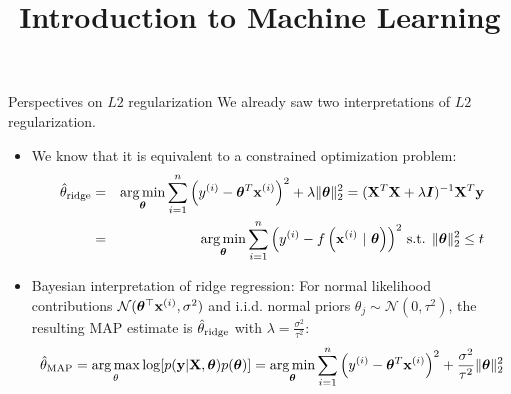 \documentclass[11pt,compress,t,notes=noshow, xcolor=table]{beamer}
\title{Introduction to Machine Learning}
\date{}
\begin{document}



\begin{vbframe}{Perspectives on $L2$ regularization}
We already saw two interpretations of $L2$ regularization. 
\begin{itemize}
    \item We know that it is equivalent to a constrained optimization problem:
  \begin{eqnarray*}  
  \hat{\theta}_{\text{ridge}} &=& \operatorname*{arg\,min}_{\bm{\theta}} \sum\limits_{i=1}^n \left(y^{(i)} - \bm{\theta}^T \mathbf{x}^{(i)} \right)^2 + \lambda \|\bm{\theta}\|_2^2 = ({\mathbf{X}}^T \mathbf{X}  + \lambda \boldsymbol{I})^{-1} \mathbf{X}^T\mathbf{y}\\
  &=& \operatorname*{arg\,min}_{\bm{\theta}} \sum\limits_{i=1}^n \left(y^{(i)} - f\left(\mathbf{x}^{(i)} ~|~ \bm{\theta}\right)\right)^2 \,
  \text{s.t. } \|\bm{\theta}\|_2^2  \leq t
  \end{eqnarray*}
  \item Bayesian interpretation of ridge regression: For normal likelihood contributions $\mathcal{N}(\bm{\theta}^{\top}\mathbf{x}^{(i)},\sigma^2)$ and i.i.d. normal priors $\theta_j \sim \mathcal{N}(0,\tau^{2})$, the resulting MAP estimate is $\hat{\theta}_{\text{ridge}}$ with $\lambda=\frac{\sigma^2}{\tau^2}$:
  $$\hat{\theta}_{\text{MAP}}=\operatorname*{arg\,max}_{\theta} \log[p(\mathbf{y}|\mathbf{X},\bm{\theta})p(\bm{\theta})] = \operatorname*{arg\,min}_{\bm{\theta}} \sum\limits_{i=1}^n \left(y^{(i)} - \bm{\theta}^T \mathbf{x}^{(i)} \right)^2 + \frac{\sigma^2}{\tau^2} \|\bm{\theta}\|_2^2$$
\end{itemize}

\end{vbframe}
\end{document}

